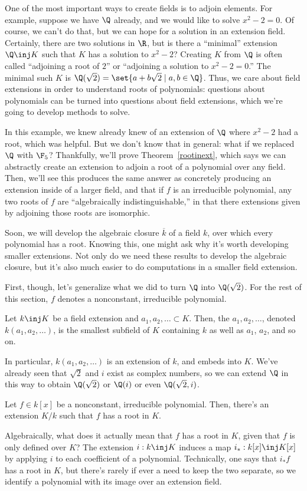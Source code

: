 One of the most important ways to create fields is to adjoin elements. For example, suppose we have $\Q$ already,
and we would like to solve $x^2 - 2 = 0$. Of course, we can't do that, but we can hope for a solution in an
extension field. Certainly, there are two solutions in $\R$, but is there a ``minimal'' extension $\Q\inj K$ such
that $K$ has a solution to $x^2 - 2$? Creating $K$ from $\Q$ is often called ``adjoining a root of $2$'' or
``adjoining a solution to $x^2 - 2 = 0$.'' The minimal such $K$ is $\Q(\sqrt 2) = \set{a+b\sqrt 2\mid a,b\in\Q}$.
Thus, we care about field extensions in order to understand roots of polynomials: questions about polynomials can
be turned into questions about field extensions, which we're going to develop methods to solve.

In this example, we knew already knew of an extension of $\Q$ where $x^2 - 2$ had a root, which was helpful. But we
don't know that in general: what if we replaced $\Q$ with $\F_5$? Thankfully, we'll prove Theorem~\ref{rootinext},
which says we can abstractly create an extension to adjoin a root of a polynomial over any field. Then, we'll see
this produces the same answer as concretely producing an extension inside of a larger field, and that if $f$ is an
irreducible polynomial, any two roots of $f$ are ``algebraically indistinguishable,'' in that there extensions
given by adjoining those roots are isomorphic.

Soon, we will develop the algebraic closure $\overline k$ of a field $k$, over which every polynomial has a root.
Knowing this, one might ask why it's worth developing smaller extensions. Not only do we need these results to
develop the algebraic closure, but it's also much easier to do computations in a smaller field extension.

First, though, let's generalize what we did to turn $\Q$ into $\Q(\sqrt 2)$. For the rest of this section, $f$
denotes a nonconstant, irreducible polynomial.
\begin{defn}
\label{fieldgen}
Let $k\inj K$ be a field extension and $a_1,a_2,\dotsc\subset K$. Then, the 
$a_1,a_2,\dotsc$, denoted $k(a_1,a_2,\dotsc)$, is the smallest subfield of $K$ containing $k$ as well as $a_1$,
$a_2$, and so on.
\end{defn}
In particular, $k(a_1,a_2,\dotsc)$ is an extension of $k$, and embeds into $K$. We've already seen that $\sqrt
2$ and $i$ exist as complex numbers, so we can extend $\Q$ in this way to obtain $\Q(\sqrt 2)$ or $\Q(i)$ or even
$\Q(\sqrt 2,i)$.
\begin{thm}
\label{rootinext}
Let $f\in k[x]$ be a nonconstant, irreducible polynomial. Then, there's an extension $K/k$ such that $f$ has a root
in $K$.
\end{thm}
Algebraically, what does it actually mean that $f$ has a root in $K$, given that $f$ is only defined over $K$? The
extension $i:k\inj K$ induces a map $i_*:k[x]\inj K[x]$ by applying $i$ to each coefficient of a polynomial.
Technically, one says that $i_*f$ has a root in $K$, but there's rarely if ever a need to keep the two separate, so
we identify a polynomial with its image over an extension field.

